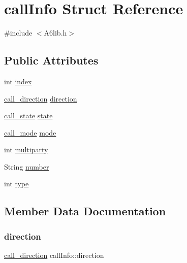 \hypertarget{structcall_info}{}\section{call\+Info Struct Reference}
\label{structcall_info}


{\ttfamily \#include $<$A6lib.\+h$>$}

\subsection*{Public Attributes}
\begin{DoxyCompactItemize}
\item 
int \mbox{\hyperlink{structcall_info_a89bafb992d4c8cc26a0601bdc88eb75e}{index}}
\item 
\mbox{\hyperlink{_a6lib_8h_a519ed4ca008815db039b8a54d741af95}{call\+\_\+direction}} \mbox{\hyperlink{structcall_info_a8c171f973e35d4dbfa82859851f47e43}{direction}}
\item 
\mbox{\hyperlink{_a6lib_8h_a6ca2e6dbf0562417ab7c66e8907a56b1}{call\+\_\+state}} \mbox{\hyperlink{structcall_info_ab0a6e03f8e276aa0129ea0acb4ea88f1}{state}}
\item 
\mbox{\hyperlink{_a6lib_8h_a9fdc9fe8189265005cb45aca0ba58270}{call\+\_\+mode}} \mbox{\hyperlink{structcall_info_af9897d6fdd8032b35e2e1238a1472780}{mode}}
\item 
int \mbox{\hyperlink{structcall_info_a26940a29da15bee68890d81f91f881ec}{multiparty}}
\item 
String \mbox{\hyperlink{structcall_info_a06648dfe13000c47925780193d11b965}{number}}
\item 
int \mbox{\hyperlink{structcall_info_a4f95adeb3a1bb04b2ba5cc5735e5e80a}{type}}
\end{DoxyCompactItemize}


\subsection{Member Data Documentation}
\mbox{\label{structcall_info_a8c171f973e35d4dbfa82859851f47e43}} 
\subsubsection{\texorpdfstring{direction}{direction}}
{\footnotesize\ttfamily \mbox{\hyperlink{_a6lib_8h_a519ed4ca008815db039b8a54d741af95}{call\+\_\+direction}} call\+Info\+::direction}

